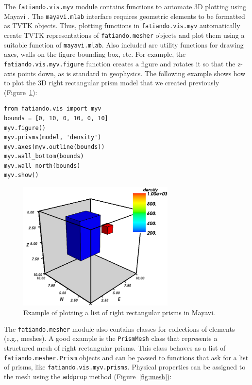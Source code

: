 The \texttt{fatiando.vis.myv} module contains functions to automate 3D plotting
using Mayavi \citep{ramachandran2011}. The \texttt{mayavi.mlab} interface
requires geometric elements to be formatted as TVTK objects. Thus, plotting
functions in \texttt{fatiando.vis.myv} automatically create TVTK
representations of \texttt{fatiando.mesher} objects and plot them using a
suitable function of \texttt{mayavi.mlab}. Also included are utility functions
for drawing axes, walls on the figure bounding box, etc. For example, the
\texttt{fatiando.vis.myv.figure} function creates a figure and rotates it so
that the z-axis points down, as is standard in geophysics. The following
example shows how to plot the 3D right rectangular prism model that we created
previously (Figure~\ref{fig:twoprisms}):

\begin{verbatim}
from fatiando.vis import myv
bounds = [0, 10, 0, 10, 0, 10]
myv.figure()
myv.prisms(model, 'density')
myv.axes(myv.outline(bounds))
myv.wall_bottom(bounds)
myv.wall_north(bounds)
myv.show()
\end{verbatim}

\begin{figure}
    \centering
    \includegraphics[width=0.7\textwidth]{figures/paper1/meshes_3dplotting_2prisms}
    \caption{
        Example of plotting a list of right rectangular prisms in Mayavi.
    }
    \label{fig:twoprisms}
\end{figure}

The \texttt{fatiando.mesher} module also contains classes for
collections of elements (e.g., meshes). A good example is the
\texttt{PrismMesh} class that represents a structured mesh of right
rectangular prisms. This class behaves as a list of
\texttt{fatiando.mesher.Prism} objects and can be passed to functions
that ask for a list of prisms, like \texttt{fatiando.vis.myv.prisms}.
Physical properties can be assigned to the mesh using the
\texttt{addprop} method (Figure~\ref{fig:mesh}):

